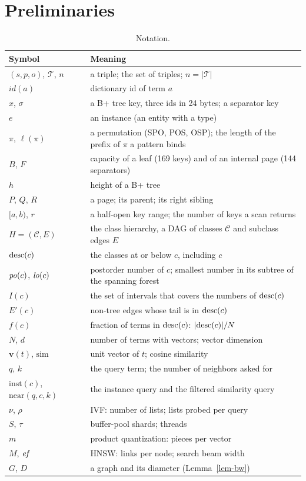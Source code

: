 \section{Preliminaries}
\label{sec-pre}

\begin{table}[t]
\caption{Notation.}
\label{tab-notation}
\small
\begin{tabular}{@{}p{2.15cm}p{5.6cm}@{}}
\toprule
Symbol & Meaning \\
\midrule
$(s,p,o)$, $\mathcal{T}$, $n$ & a triple; the set of triples; $n=|\mathcal{T}|$ \\
$\mathit{id}(a)$ & dictionary id of term $a$ \\
$x$, $\sigma$ & a B+ tree key, three ids in 24 bytes; a separator key \\
$e$ & an instance (an entity with a type) \\
$\pi$, $\ell(\pi)$ & a permutation (SPO, POS, OSP); the length of the prefix of $\pi$ a pattern binds \\
$B$, $F$ & capacity of a leaf (169 keys) and of an internal page (144 separators) \\
$h$ & height of a B+ tree \\
$P$, $Q$, $R$ & a page; its parent; its right sibling \\
$[a,b)$, $r$ & a half-open key range; the number of keys a scan returns \\
$H=(\mathcal{C},E)$ & the class hierarchy, a DAG of classes $\mathcal{C}$ and subclass edges $E$ \\
$\mathrm{desc}(c)$ & the classes at or below $c$, including $c$ \\
$\mathit{po}(c)$, $\mathit{lo}(c)$ & postorder number of $c$; smallest number in its subtree of the spanning forest \\
$I(c)$ & the set of intervals that covers the numbers of $\mathrm{desc}(c)$ \\
$E'(c)$ & non-tree edges whose tail is in $\mathrm{desc}(c)$ \\
$f(c)$ & fraction of terms in $\mathrm{desc}(c)$: $|\mathrm{desc}(c)|/N$ \\
$N$, $d$ & number of terms with vectors; vector dimension \\
$\mathbf{v}(t)$, $\mathrm{sim}$ & unit vector of $t$; cosine similarity \\
$q$, $k$ & the query term; the number of neighbors asked for \\
$\mathrm{inst}(c)$, $\mathrm{near}(q,c,k)$ & the instance query and the filtered similarity query \\
$\nu$, $\rho$ & IVF: number of lists; lists probed per query \\
$S$, $\tau$ & buffer-pool shards; threads \\
$m$ & product quantization: pieces per vector \\
$M$, $\mathit{ef}$ & HNSW: links per node; search beam width \\
$G$, $D$ & a graph and its diameter (Lemma~\ref{lem-bw}) \\
\bottomrule
\end{tabular}
\end{table}

